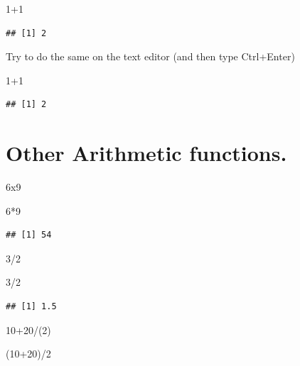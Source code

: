 \documentclass[
]{book}
\newenvironment{Shaded}{\begin{snugshade}}{\end{snugshade}}
\newcommand{\DecValTok}[1]{\textcolor[rgb]{0.00,0.00,0.81}{#1}}
\newcommand{\NormalTok}[1]{#1}
\newcommand{\SpecialCharTok}[1]{\textcolor[rgb]{0.00,0.00,0.00}{#1}}
\begin{document}
\begin{Shaded}
\begin{Highlighting}[]
\DecValTok{1}\SpecialCharTok{+}\DecValTok{1} 
\end{Highlighting}
\end{Shaded}

\begin{verbatim}
## [1] 2
\end{verbatim}

Try to do the same on the text editor (and then type Ctrl+Enter)

\begin{Shaded}
\begin{Highlighting}[]
\DecValTok{1}\SpecialCharTok{+}\DecValTok{1}
\end{Highlighting}
\end{Shaded}

\begin{verbatim}
## [1] 2
\end{verbatim}

\hypertarget{other-arithmetic-functions.}{%
\section{Other Arithmetic functions.}\label{other-arithmetic-functions.}}

6x9

\begin{Shaded}
\begin{Highlighting}[]
\DecValTok{6}\SpecialCharTok{*}\DecValTok{9}
\end{Highlighting}
\end{Shaded}

\begin{verbatim}
## [1] 54
\end{verbatim}

3/2

\begin{Shaded}
\begin{Highlighting}[]
\DecValTok{3}\SpecialCharTok{/}\DecValTok{2}
\end{Highlighting}
\end{Shaded}

\begin{verbatim}
## [1] 1.5
\end{verbatim}

10+20/(2)

\begin{Shaded}
\begin{Highlighting}[]
\NormalTok{(}\DecValTok{10}\SpecialCharTok{+}\DecValTok{20}\NormalTok{)}\SpecialCharTok{/}\DecValTok{2}
\end{Highlighting}
\end{Shaded}
\end{document}
